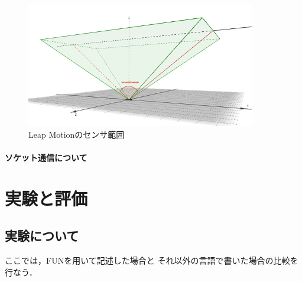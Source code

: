 \documentclass{funthesis}
\begin{document}
 \begin{figure}[H]
 \begin{center}
  \includegraphics[width=100mm]{./img/LeapAngle.png}
 \end{center}
 \caption{Leap Motionのセンサ範囲}
 \label{leap}
\end{figure}



\subsubsection{ソケット通信について}



\chapter{実験と評価}

\section{実験について}

ここでは，FUNを用いて記述した場合と
それ以外の言語で書いた場合の比較を行なう．


\end{document}
